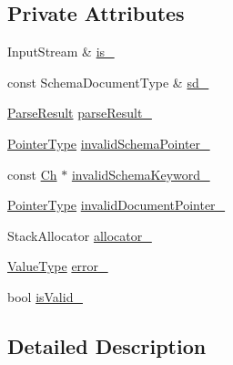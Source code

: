 \subsection*{Private Attributes}
\begin{DoxyCompactItemize}
\item 
Input\+Stream \& \mbox{\hyperlink{classrapidjson_1_1_schema_validating_reader_ae3443e580ba1f89f909d0427b5fc2a12}{is\+\_\+}}
\item 
const Schema\+Document\+Type \& \mbox{\hyperlink{classrapidjson_1_1_schema_validating_reader_ac8ff3d5618d18af30ccce4b85155e0bf}{sd\+\_\+}}
\item 
\mbox{\hyperlink{structrapidjson_1_1_parse_result}{Parse\+Result}} \mbox{\hyperlink{classrapidjson_1_1_schema_validating_reader_a03ee9d61d5051eb0d97eca449d6c2615}{parse\+Result\+\_\+}}
\item 
\mbox{\hyperlink{classrapidjson_1_1_schema_validating_reader_a42c64d1ed25ffb2e70a35b9e43e0e564}{Pointer\+Type}} \mbox{\hyperlink{classrapidjson_1_1_schema_validating_reader_ac501cd85bafe1723f8f90e17b5979a2d}{invalid\+Schema\+Pointer\+\_\+}}
\item 
const \mbox{\hyperlink{classrapidjson_1_1_schema_validating_reader_a3507a4886ce6778fe1cae39ed5f0baaf}{Ch}} $\ast$ \mbox{\hyperlink{classrapidjson_1_1_schema_validating_reader_a409c3e18192a623a92573f8a84596df2}{invalid\+Schema\+Keyword\+\_\+}}
\item 
\mbox{\hyperlink{classrapidjson_1_1_schema_validating_reader_a42c64d1ed25ffb2e70a35b9e43e0e564}{Pointer\+Type}} \mbox{\hyperlink{classrapidjson_1_1_schema_validating_reader_a3e156223031fb88ccc7e51aa25d2d063}{invalid\+Document\+Pointer\+\_\+}}
\item 
Stack\+Allocator \mbox{\hyperlink{classrapidjson_1_1_schema_validating_reader_a115cbcbdbd933a36883934eb49cb4576}{allocator\+\_\+}}
\item 
\mbox{\hyperlink{classrapidjson_1_1_schema_validating_reader_a6fb634fa68daaa8c185136258042f4c6}{Value\+Type}} \mbox{\hyperlink{classrapidjson_1_1_schema_validating_reader_adba5335f9c3577e2960c8c762c119abc}{error\+\_\+}}
\item 
bool \mbox{\hyperlink{classrapidjson_1_1_schema_validating_reader_a92253c14145f392cbc7e058388629003}{is\+Valid\+\_\+}}
\end{DoxyCompactItemize}


\subsection{Detailed Description}
